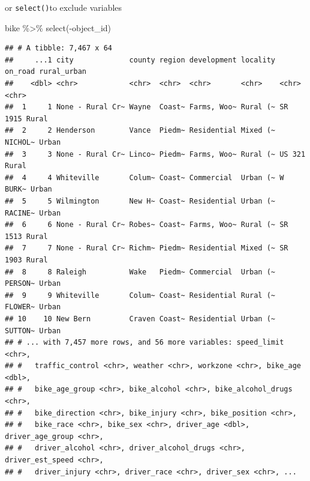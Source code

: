 \documentclass[
  ignorenonframetext,
]{beamer}
\newenvironment{Shaded}{\begin{snugshade}}{\end{snugshade}}
\newcommand{\FunctionTok}[1]{\textcolor[rgb]{0.00,0.00,0.00}{#1}}
\newcommand{\NormalTok}[1]{#1}
\newcommand{\SpecialCharTok}[1]{\textcolor[rgb]{0.00,0.00,0.00}{#1}}
\begin{document}
\begin{frame}[fragile]{or \texttt{select()}to exclude variables}
\protect\hypertarget{or-selectto-exclude-variables}{}
\begin{Shaded}
\begin{Highlighting}[]
\NormalTok{bike }\SpecialCharTok{\%\textgreater{}\%}
  \FunctionTok{select}\NormalTok{(}\SpecialCharTok{{-}}\NormalTok{object\_id)}
\end{Highlighting}
\end{Shaded}

\begin{verbatim}
## # A tibble: 7,467 x 64
##     ...1 city             county region development locality on_road rural_urban
##    <dbl> <chr>            <chr>  <chr>  <chr>       <chr>    <chr>   <chr>      
##  1     1 None - Rural Cr~ Wayne  Coast~ Farms, Woo~ Rural (~ SR 1915 Rural      
##  2     2 Henderson        Vance  Piedm~ Residential Mixed (~ NICHOL~ Urban      
##  3     3 None - Rural Cr~ Linco~ Piedm~ Farms, Woo~ Rural (~ US 321  Rural      
##  4     4 Whiteville       Colum~ Coast~ Commercial  Urban (~ W BURK~ Urban      
##  5     5 Wilmington       New H~ Coast~ Residential Urban (~ RACINE~ Urban      
##  6     6 None - Rural Cr~ Robes~ Coast~ Farms, Woo~ Rural (~ SR 1513 Rural      
##  7     7 None - Rural Cr~ Richm~ Piedm~ Residential Mixed (~ SR 1903 Rural      
##  8     8 Raleigh          Wake   Piedm~ Commercial  Urban (~ PERSON~ Urban      
##  9     9 Whiteville       Colum~ Coast~ Residential Rural (~ FLOWER~ Urban      
## 10    10 New Bern         Craven Coast~ Residential Urban (~ SUTTON~ Urban      
## # ... with 7,457 more rows, and 56 more variables: speed_limit <chr>,
## #   traffic_control <chr>, weather <chr>, workzone <chr>, bike_age <dbl>,
## #   bike_age_group <chr>, bike_alcohol <chr>, bike_alcohol_drugs <chr>,
## #   bike_direction <chr>, bike_injury <chr>, bike_position <chr>,
## #   bike_race <chr>, bike_sex <chr>, driver_age <dbl>, driver_age_group <chr>,
## #   driver_alcohol <chr>, driver_alcohol_drugs <chr>, driver_est_speed <chr>,
## #   driver_injury <chr>, driver_race <chr>, driver_sex <chr>, ...
\end{verbatim}
\end{frame}
\end{document}
